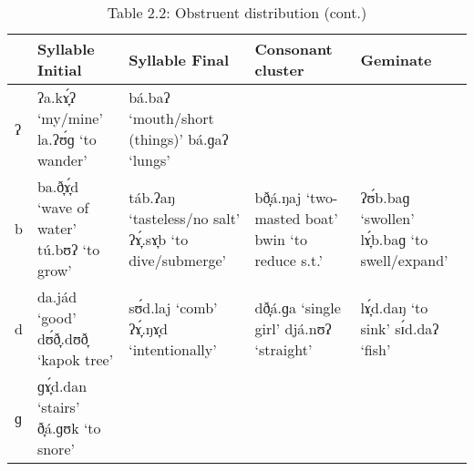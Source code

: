 \begin{table}[p]
\caption*{Table 2.2: Obstruent distribution (cont.)}
\begin{tabularx}{\textwidth}{lQQQQ}
\midrule
 & Syllable Initial & Syllable Final & Consonant cluster & Geminate \\
\midrule
{}ʔ & ʔa.kɤ̞́ʔ \newline ‘my/mine’
\newline
la.ʔʊ́ɡ \newline ‘to wander’ &
bá.baʔ \newline ‘mouth/short (things)’
\newline
bá.ɡaʔ \newline ‘lungs’ & & \\
\tablevspace
b & ba.ð̞ɤ̞́d \newline ‘wave of water’
\newline
tú.bʊʔ \newline ‘to grow’ &
táb.ʔaŋ \newline ‘tasteless/no salt’
\newline
ʔɤ̞́.sɤ̞b \newline ‘to dive/submerge’ &
bð̞á.ŋaj \newline ‘two-masted boat’
\newline
bwin \newline ‘to reduce s.t.’ &
ʔʊ́b.baɡ \newline ‘swollen’
\newline
lɤ̞́b.baɡ \newline ‘to swell/expand’ \\
\tablevspace
d & da.jád \newline ‘good’
\newline
dʊ́ð̞.dʊð̞ \newline ‘kapok tree’ &
sʊ́d.laj \newline ‘comb’
\newline
ʔɤ̞́.ŋɤ̞d \newline ‘intentionally’ &
dð̞á.ɡa \newline ‘single girl’
\newline
djá.nʊʔ  \newline ‘straight’ &
lɤ̞́d.daŋ \newline ‘to sink’
\newline
sɪ́d.daʔ \newline ‘fish’ \\
\tablevspace
ɡ & ɡɤ̞́d.dan \newline ‘stairs’
\newline
ð̞á.ɡʊk \newline ‘to snore’ &

\end{tabularx}
\end{table}
